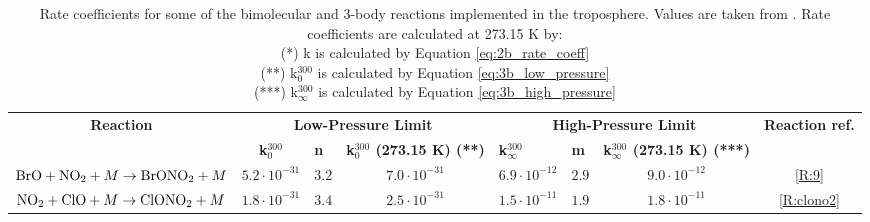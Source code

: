 \begin{table}[]
{\begin{tabular}{|c|ccc|c|c|c|l|}
\multirow{2}{*}{\textbf{Reaction}}                                   & \multicolumn{3}{c}{\textbf{Low-Pressure Limit}}                                                                          & \multicolumn{3}{c|}{\textbf{High-Pressure Limit}}                                                                             & \multirow{2}{*}{\textbf{Reaction ref.}} \\ \cline{2-7}
                                                                     & \multicolumn{1}{c|}{\textbf{k$_0^{300}$}} & \multicolumn{1}{l|}{\textbf{n}} & \multicolumn{1}{l|}{\textbf{k$_0^{300}$ (273.15 K) (**)}} & \multicolumn{1}{l|}{\textbf{k$_\infty^{300}$}} & \multicolumn{1}{l|}{\textbf{m}} & \multicolumn{1}{l|}{\textbf{k$_\infty^{300}$ (273.15 K) (***)}} &                                         \\ \hline
$\mathrm{BrO} + \mathrm{NO_2} + M \rightarrow \mathrm{BrONO_2} + M$        & \multicolumn{1}{c|}{$5.2\cdot10^{-31}$}   & \multicolumn{1}{c|}{$3.2$}      & $7.0\cdot10^{-31}$                         & $6.9\cdot10^{-12}$                             & $2.9$                           & $9.0\cdot10^{-12}$                         & \multicolumn{1}{c|}{\ref{R:9}}          \\
$\mathrm{NO_2} + \mathrm{ClO} + M \rightarrow \mathrm{ClONO_2} + M $       & \multicolumn{1}{c|}{$1.8\cdot10^{-31}$}   & \multicolumn{1}{c|}{$3.4$}      & $2.5\cdot10^{-31}$                         & $1.5\cdot10^{-11}$                             & $1.9$                           & $1.8\cdot10^{-11}$                         & \multicolumn{1}{c|}{\ref{R:clono2}}     \\ \hline
\end{tabular}
}
\caption{Rate coefficients for some of the bimolecular and 3-body reactions implemented in the troposphere. Values are taken from \cite{JPL}. Rate coefficients are calculated at 273.15 K by: 
\\ 
(*) k is calculated by Equation \ref{eq:2b_rate_coeff} 
\\ 
(**) k$_0^{300}$ is calculated by Equation \ref{eq:3b_low_pressure} 
\\ 
(***) k$_\infty^{300}$ is calculated by Equation \ref{eq:3b_high_pressure}} 
\label{tab:2b_and_3b_reactions}
\end{table}